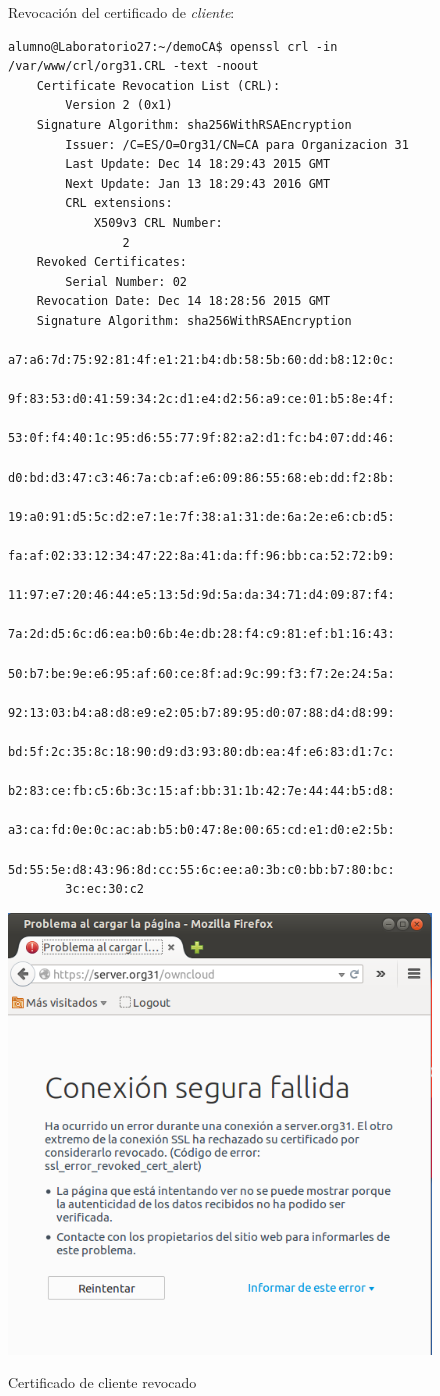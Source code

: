 \documentclass[]{article}
\begin{document}
\begin{figure}[h]
	Revocación del certificado de \textit{cliente}:
\begin{Verbatim}[frame=single]
alumno@Laboratorio27:~/demoCA$ openssl crl -in /var/www/crl/org31.CRL -text -noout 
	Certificate Revocation List (CRL):
		Version 2 (0x1)
	Signature Algorithm: sha256WithRSAEncryption
		Issuer: /C=ES/O=Org31/CN=CA para Organizacion 31
		Last Update: Dec 14 18:29:43 2015 GMT
		Next Update: Jan 13 18:29:43 2016 GMT
		CRL extensions:
			X509v3 CRL Number: 
				2
	Revoked Certificates:
		Serial Number: 02
	Revocation Date: Dec 14 18:28:56 2015 GMT
	Signature Algorithm: sha256WithRSAEncryption
		a7:a6:7d:75:92:81:4f:e1:21:b4:db:58:5b:60:dd:b8:12:0c:
		9f:83:53:d0:41:59:34:2c:d1:e4:d2:56:a9:ce:01:b5:8e:4f:
		53:0f:f4:40:1c:95:d6:55:77:9f:82:a2:d1:fc:b4:07:dd:46:
		d0:bd:d3:47:c3:46:7a:cb:af:e6:09:86:55:68:eb:dd:f2:8b:
		19:a0:91:d5:5c:d2:e7:1e:7f:38:a1:31:de:6a:2e:e6:cb:d5:
		fa:af:02:33:12:34:47:22:8a:41:da:ff:96:bb:ca:52:72:b9:
		11:97:e7:20:46:44:e5:13:5d:9d:5a:da:34:71:d4:09:87:f4:
		7a:2d:d5:6c:d6:ea:b0:6b:4e:db:28:f4:c9:81:ef:b1:16:43:
		50:b7:be:9e:e6:95:af:60:ce:8f:ad:9c:99:f3:f7:2e:24:5a:
		92:13:03:b4:a8:d8:e9:e2:05:b7:89:95:d0:07:88:d4:d8:99:
		bd:5f:2c:35:8c:18:90:d9:d3:93:80:db:ea:4f:e6:83:d1:7c:
		b2:83:ce:fb:c5:6b:3c:15:af:bb:31:1b:42:7e:44:44:b5:d8:
		a3:ca:fd:0e:0c:ac:ab:b5:b0:47:8e:00:65:cd:e1:d0:e2:5b:
		5d:55:5e:d8:43:96:8d:cc:55:6c:ee:a0:3b:c0:bb:b7:80:bc:
		3c:ec:30:c2
\end{Verbatim}
\end{figure}


\begin{figure}[h]
	\caption{Certificado de cliente revocado}
	\centering
	\includegraphics[scale=0.5]{images/certs/revoked.png}
	\label{fig:revoked}
\end{figure}




               
   
\end{document}

